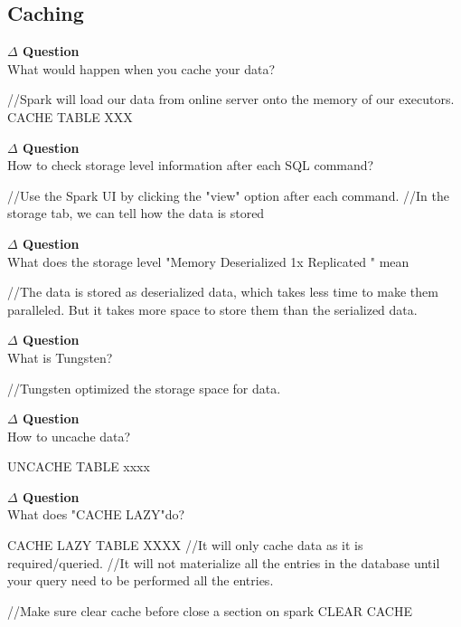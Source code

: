 \documentclass[12pt]{article}
\newenvironment{que}
    { \begin{mdframed}[backgroundcolor=green!20] \textbf{$\Delta$ Question} \\}
    {  \end{mdframed}}
\begin{document}
\subsection{Caching}
\begin{que}
What would happen when you cache your data?
\end{que}
\begin{code}
//Spark will load our data from online server onto the memory of our executors.
CACHE TABLE XXX
\end{code}
\begin{que}
How to check storage level information after each SQL command?
\end{que}
\begin{code}
//Use the Spark UI by clicking the "view" option after each command.
//In the storage tab, we can tell how the data is stored 
\end{code}
\begin{que}
What does the storage level "Memory Deserialized 1x Replicated " mean
\end{que}
\begin{code}
//The data is stored as deserialized data, which takes less time to make them paralleled. But it takes more space to store them than the serialized data.
\end{code}
\begin{que}
What is Tungsten?
\end{que}
\begin{code}
//Tungsten optimized the storage space for data.
\end{code}
\begin{que}
How to uncache data? 
\end{que}
\begin{code}
UNCACHE TABLE xxxx
\end{code}
\begin{que}
What does "CACHE LAZY"do?
\end{que}
\begin{code}
CACHE LAZY TABLE XXXX
//It will only cache data as it is required/queried.
//It will not materialize all the entries in the database until your query need to be performed all the entries.
\end{code}
\begin{code}
//Make sure clear cache before close a section on spark
CLEAR CACHE
\end{code}
\end{document}
